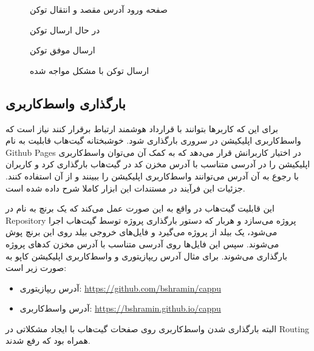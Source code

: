 \begin{figure}[H]
\centerline{}
\caption{صفحه ورود آدرس مقصد و انتقال توکن}
\label{fig:transfer-modal}
\end{figure}

\begin{figure}[H]
\centerline{}
\caption{در حال ارسال توکن}
\label{fig:transfer-loading}
\end{figure}

\begin{figure}[H]
\centerline{}
\caption{ارسال موفق توکن}
\label{fig:transfer-success}
\end{figure}

\begin{figure}[H]
\centerline{}
\caption{ارسال توکن با مشکل مواجه شده}
\label{fig:transfer-error}
\end{figure}


\subsection{بارگذاری واسط‌کاربری}
برای این که کاربرها بتوانند با قرارداد هوشمند ارتباط برقرار کنند نیاز است که واسط‌کاربری اپلیکیشن در سروری بارگذاری شود.
خوشبختانه گیت‌هاب قابلیت به نام
\gls{Github Pages}
در اختیار کاربرانش قرار می‌دهد
که به کمک آن می‌توان واسط‌کاربری اپلیکیشن را در آدرسی متناسب با آدرس مخزن کد در گیت‌هاب بارگذاری کرد
و کاربران با رجوع به آن آدرس می‌توانند واسط‌کاربری اپلیکیشن را ببینند و از آن استفاده کنند.
جزئیات این فرآیند در مستندات این ابزار
\cite{GithubPages}
کاملا شرح داده شده است.

این قابلیت گیت‌هاب در واقع به این صورت عمل می‌کند که یک برنچ به نام
در
\gls{Repository}
پروژه می‌سازد و هربار که دستور بارگذاری پروژه توسط گیت‌هاب اجرا می‌شود،
یک بیلد از پروژه می‌گیرد و فایل‌های خروجی بیلد روی این برنچ پوش می‌شوند.
سپس این فایل‌ها روی آدرسی متناسب با آدرس مخزن کد‌های پروژه بارگذاری می‌شوند.
برای مثال آدرس ریپازیتوری و واسط‌کاربری اپلیکیشن کاپو به صورت زیر است:
\begin{itemize}
  \item
  آدرس ریپازیتوری: \url{https://github.com/bshramin/cappu}
  \item
  آدرس واسط‌کاربری: \url{https://bshramin.github.io/cappu}
\end{itemize}
البته بارگذاری شدن واسط‌کاربری روی صفحات گیت‌هاب با ایجاد مشکلاتی در
\gls{Routing}
همراه بود که رفع شدند.


